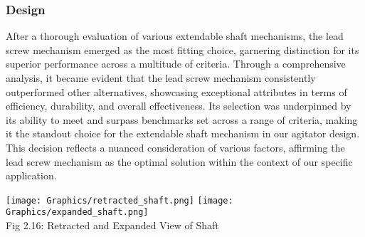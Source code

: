 \documentclass[a4,10pt]{report}
\begin{document}
\subsubsection{Design}
After a thorough evaluation of various extendable shaft mechanisms, the lead screw mechanism emerged as the most fitting choice, garnering distinction for its superior performance across a multitude of criteria. Through a comprehensive analysis, it became evident that the lead screw mechanism consistently outperformed other alternatives, showcasing exceptional attributes in terms of efficiency, durability, and overall effectiveness. Its selection was underpinned by its ability to meet and surpass benchmarks set across a range of criteria, making it the standout choice for the extendable shaft mechanism in our agitator design. This decision reflects a nuanced consideration of various factors, affirming the lead screw mechanism as the optimal solution within the context of our specific application.
\begin{center}
    \texttt{[image: Graphics/retracted\_shaft.png]}
    \texttt{[image: Graphics/expanded\_shaft.png]} \\
    \normalsize{Fig 2.16: Retracted and Expanded View of Shaft}
\end{center} \\ 
\end{document}
